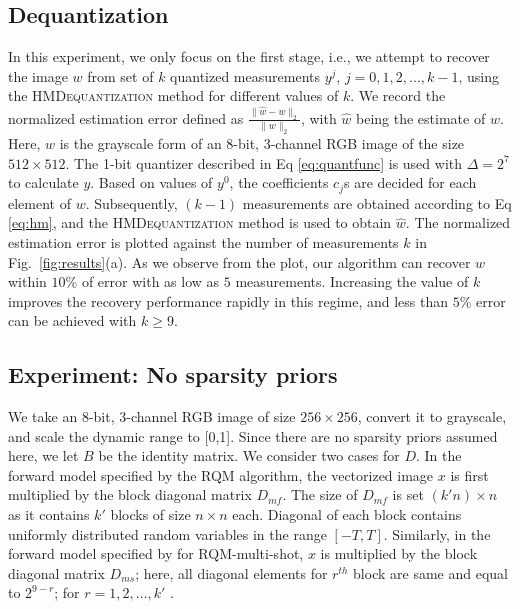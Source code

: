 \subsection{Dequantization}
	\vspace{-0.4em}%
In this experiment, we only focus on the first stage, i.e., we attempt to recover the image $w$ from set of $k$ quantized measurements $y^j$, $j=0,1,2,...,k-1$, using the \textsc{HMDequantization} method for different values of $k$. We record the normalized estimation error defined as $\frac{\|\widehat{w}-w\|_2}{\|w\|_2}$, with $\widehat{w}$ being the estimate of $w$. Here, $w$ is the grayscale form of an 8-bit, 3-channel RGB image of the size $512 \times 512$. The 1-bit quantizer described in Eq \eqref{eq:quantfunc} is used with $\Delta = 2^7$ to calculate $y$. Based on values of $y^0$, the coefficients $c_j$s are decided for each element of $w$. Subsequently, $(k-1)$ measurements are obtained according to Eq \eqref{eq:hm}, and the \textsc{HMDequantization} method is used to obtain $\widehat{w}$. The normalized estimation error is plotted against the number of measurements $k$ in Fig.~\ref{fig:results}(a). As we observe from the plot, our algorithm can recover $w$ within $10\%$ of error with as low as $5$ measurements. Increasing the value of $k$ improves the recovery performance rapidly in this regime, and less than $5\%$ error can be achieved with $k\geq9$. %



	\vspace{-0.7em}%
\subsection{Experiment: No sparsity priors}
	\vspace{-0.3em}%
We take an 8-bit, 3-channel RGB image of size $256 \times 256$, convert it to grayscale, and scale the dynamic range to [0,1]. Since there are no sparsity priors assumed here, we let $B$ be the identity matrix. We consider two cases for $D$. In the forward model specified by the RQM algorithm, the vectorized image $x$ is first multiplied by the block diagonal matrix $D_{mf}$. The size of $D_{mf}$ is set $(k'n) \times n$ as it contains $k'$ blocks of size $n \times n$ each. Diagonal of each block contains uniformly distributed random variables in the range $[-T,T]$.  Similarly, in the forward model specified by for RQM-multi-shot, $x$ is multiplied by the block diagonal matrix $D_{ms}$; here, all diagonal elements for $r^{th}$ block are same and equal to $2^{9-r}$; for $r = 1,2, \ldots, k'$ \cite{ICCP15_Zhao}. 


